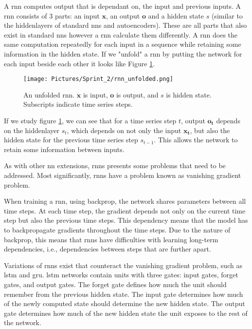 A \gls{rnn} computes output that is dependant on, the input and previous inputs. A \gls{rnn} consists of 3 parts: an input $\boldsymbol{x}$, an output $\boldsymbol{o}$ and a hidden state $s$ (similar to the \glspl{hiddenlayer} of standard \glspl{nn} and autoencoders). These are all parts that also exist in standard \glspl{nn} however a \gls{rnn} calculate them differently. A \gls{rnn} does the same computation repeatedly for each input in a sequence while retaining some information in the hidden state. If we "unfold" a \gls{rnn} by putting the network for each input beside each other it looks like Figure \ref{fig:unfolded_rnn}.\cite{rnn_tutorial}

\begin{figure}[htbp]
    \centering
    \texttt{[image: Pictures/Sprint\_2/rnn\_unfolded.png]}
    \caption{An unfolded \gls{rnn}. $\boldsymbol{x}$ is input, $\boldsymbol{o}$ is output, and $s$ is hidden state. Subscripts indicate time series steps.\cite{rnn_tutorial}}
    \label{fig:unfolded_rnn}
\end{figure}

If we study figure \ref{fig:unfolded_rnn}, we can see that for a time series step $t$, output $\boldsymbol{o_t}$ depends on the \gls{hiddenlayer} $s_t$, which depends on not only the input $\boldsymbol{x_t}$, but also the hidden state for the previous time series step $s_{t-1}$. This allows the network to retain some information between inputs.\cite{rnn_tutorial}

As with other \gls{nn} extensions, \glspl{rnn} presents some problems that need to be addressed. Most significantly, \glspl{rnn} have a problem known as vanishing gradient problem.\cite{rnn_tutorial}

When training a \gls{rnn}, using \gls{backprop}, the network shares parameters between all time steps. At each time step, the gradient depends not only on the current time step but also the previous time steps. This dependency means that the model has to backpropagate gradients throughout the time steps. Due to the nature of \gls{backprop}, this means that \glspl{rnn} have difficulties with learning long-term dependencies, i.e., dependencies between steps that are further apart.\cite{rnn_tutorial}

Variations of \glspl{rnn} exist that counteract the vanishing gradient problem, such as \gls{lstm} and \gls{gru}. \gls{lstm} networks contain units with three gates: input gates, forget gates, and output gates. The forget gate defines how much the unit should remember from the previous hidden state. The input gate determines how much of the newly computed state should determine the new hidden state. The output gate determines how much of the new hidden state the unit exposes to the rest of the network.\cite{lstm_gru_tutorial}

